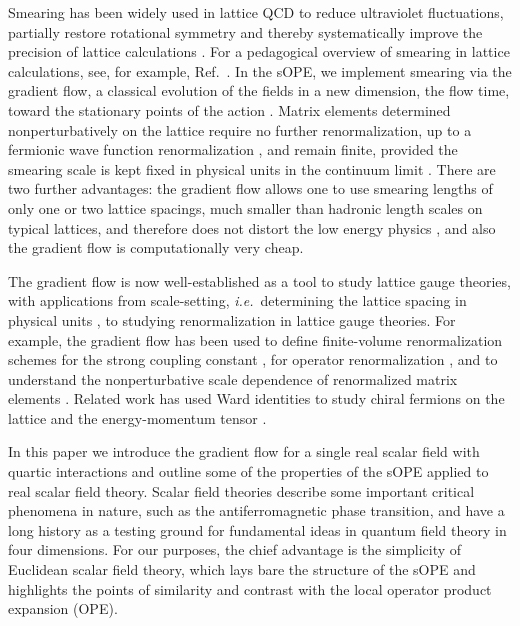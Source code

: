 Smearing has been widely used in lattice QCD to reduce ultraviolet 
fluctuations, partially restore rotational symmetry and thereby systematically 
improve the precision of lattice calculations 
\cite{Morningstar:2003gk,Hasenfratz:2001hp,Bernard:1999kc,Albanese:1987as}. For 
a pedagogical overview of smearing in lattice 
calculations, see, for example, Ref.~\cite{Gattringer:2010zz}. In the sOPE, we 
implement smearing 
via the gradient flow, a classical evolution of the fields in a new dimension, 
the flow time, toward the stationary points of the action 
\cite{Luscher:2013cpa,Luscher:2011bx,Lohmayer:2011si,Luscher:2010iy,
Narayanan:2006rf}. 
Matrix elements determined nonperturbatively on the lattice require no further 
renormalization, up to a fermionic wave function renormalization 
\cite{Luscher:2013cpa}, and remain 
finite, provided the smearing scale is kept fixed in physical units in the 
continuum limit \cite{Makino:2014sta,Luscher:2011bx}. There are two further 
advantages: the gradient flow allows one to use smearing lengths 
of only one or two lattice spacings, much smaller than hadronic length scales 
on typical lattices, and therefore does not distort the low energy physics 
\cite{Davoudi:2012ya}, and also the gradient flow is computationally very 
cheap. 

The gradient flow is now well-established as a tool to study lattice 
gauge theories, with applications from scale-setting, 
\emph{i.e.}~determining the lattice spacing in physical units 
\cite{Borsanyi:2012zr,Borsanyi:2012zs,Bazavov:2013gca,Fodor:2014cpa,
Cheng:2014jba}, to studying renormalization in 
lattice gauge theories. For example, 
the gradient flow has been used to define finite-volume renormalization schemes 
for the strong coupling constant
\cite{Fodor:2012td,Fritzsch:2013yxa,Fritzsch:2013hda, 
Ramos:2013gda,Rantaharju:2013bva}, for operator 
renormalization \cite{Monahan:2013lwa}, and to understand the nonperturbative 
scale dependence of renormalized matrix elements \cite{Luscher:2014kea}. 
Related work has used Ward identities to study chiral fermions on 
the lattice \cite{Shindler:2013bia} and the energy-momentum tensor 
\cite{Suzuki:2013gza,DelDebbio:2013zaa, Makino:2014taa}.

In this paper we introduce the gradient flow for a 
single real scalar field with quartic interactions and outline some of the 
properties of the sOPE applied to real scalar field theory.
Scalar field theories describe some important critical 
phenomena in nature, such as the antiferromagnetic phase transition, and 
have a long history as a testing ground for fundamental ideas in 
quantum field theory in four dimensions. For our purposes, the chief advantage 
is the simplicity of Euclidean scalar field theory, which lays bare the 
structure of the sOPE and highlights the points of similarity and contrast with 
the local operator product expansion (OPE). 

